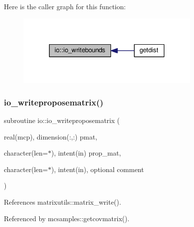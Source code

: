 Here is the caller graph for this function\+:
\nopagebreak
\begin{figure}[H]
\begin{center}
\leavevmode
\includegraphics[width=258pt]{namespaceio_a767aeea14da167ae9027cac1b5b0a021_icgraph}
\end{center}
\end{figure}
\mbox{\label{namespaceio_a66f16ed76a4e04dc87230befac8fb1cf}} 
\subsubsection{\texorpdfstring{io\+\_\+writeproposematrix()}{io\_writeproposematrix()}}
{\footnotesize\ttfamily subroutine io\+::io\+\_\+writeproposematrix (\begin{DoxyParamCaption}\item[{real(mcp), dimension(\+:,\+:)}]{pmat,  }\item[{character(len=$\ast$), intent(in)}]{prop\+\_\+mat,  }\item[{character(len=$\ast$), intent(in), optional}]{comment }\end{DoxyParamCaption})}



References matrixutils\+::matrix\+\_\+write().



Referenced by mcsamples\+::getcovmatrix().

